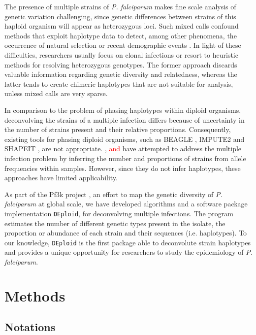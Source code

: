 \documentclass{bioinfo}
\newcounter{todocounter}
\newcommand{\done}[2][]
{\todo[color=green!40, #1]{#2}}
\newcommand{\donenum}[2][]
{\stepcounter{todocounter}\done[#1]{\thetodocounter: #2}}
\begin{document}
The presence of multiple strains of {\it P. falciparum} makes fine scale analysis of genetic variation challenging, since genetic differences between strains of this haploid organism will appear as heterozygous loci. Such mixed calls confound methods that exploit haplotype data to detect, among other phenomena, the occurrence of natural selection or recent demographic events \citep{Harris2013, Lawson2012, Mathieson2014, Sabeti2002}. In light of these difficulties, researchers usually focus on clonal infections or resort to heuristic methods for resolving heterozygous genotypes. The former approach discards valuable information regarding genetic diversity and relatedness, whereas the latter tends to create chimeric haplotypes that are not suitable for analysis, unless mixed calls are very sparse.

In comparison to the problem of phasing haplotypes within diploid organisms, deconvolving the strains of a multiple infection differs because of uncertainty in the number of strains present and their relative proportions.  Consequently, existing tools for phasing diploid organisms, such as BEAGLE \citep{Browning2007}, IMPUTE2 \citep{Howie2009} and SHAPEIT \citep{Delaneau2012, Oconnell2014}, are not appropriate. \citet{Galinsky2015}, \citet{Jack2016} \donenum{REV1.20: O'Brien (2016)} \textcolor{red}{and} \citet{Chang2017} have attempted to address the multiple infection problem by inferring the number and proportions of strains from allele frequencies within samples.  However, since they do not infer haplotypes, these approaches have limited applicability.

As part of the Pf3k project \citep{Pf3k2016}, an effort to map the genetic diversity of {\it P. falciparum} at global scale, we have developed algorithms and a software package implementation \texttt{DEploid}, for deconvolving multiple infections. The program estimates the number of different genetic types present in the isolate, the proportion or abundance of each strain and their sequences (i.e. haplotypes). To our knowledge, \texttt{DEploid} is the first package able to deconvolute strain haplotypes and provides a unique opportunity for researchers to study the epidemiology of {\it P. falciparum}.


\section{Methods}

\subsection{Notations}
\end{document}
